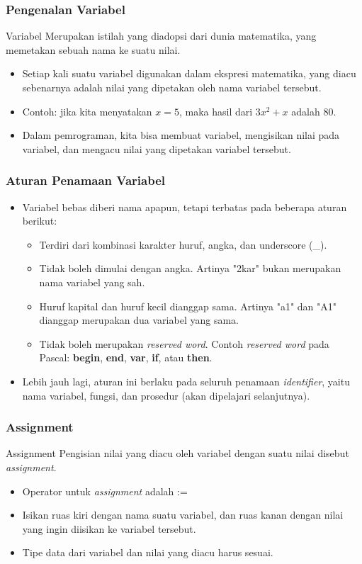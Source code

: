 \begin{frame}[b]
\frametitle{Pengenalan Variabel}
\begin{block}{Variabel}
   Merupakan istilah yang diadopsi dari dunia matematika, yang memetakan sebuah nama ke suatu nilai.
\end{block}
\begin{itemize}
  \item Setiap kali suatu variabel digunakan dalam ekspresi matematika, yang diacu sebenarnya adalah nilai yang dipetakan oleh nama variabel tersebut.
  \item Contoh: jika kita menyatakan $x=5$, maka hasil dari $3x^2 + x$ adalah $80$.
  \item Dalam pemrograman, kita bisa membuat variabel, mengisikan nilai pada variabel, dan mengacu nilai yang dipetakan variabel tersebut.
\end{itemize}
\end{frame}

\begin{frame}
\frametitle{Aturan Penamaan Variabel}
\begin{itemize}
  \item Variabel bebas diberi nama apapun, tetapi terbatas pada beberapa aturan berikut:
  \begin{itemize}
    \item Terdiri dari kombinasi karakter huruf, angka, dan underscore (\_).
    \item Tidak boleh dimulai dengan angka. Artinya "2kar" bukan merupakan nama variabel yang sah.
    \item Huruf kapital dan huruf kecil dianggap sama. Artinya "a1" dan "A1" dianggap merupakan dua variabel yang sama.
    \item Tidak boleh merupakan \alert{\textit{reserved word}}. Contoh \textit{reserved word} pada Pascal: \textbf{begin}, \textbf{end}, \textbf{var}, \textbf{if}, atau \textbf{then}.
  \end{itemize}
  \item Lebih jauh lagi, aturan ini berlaku pada seluruh penamaan \alert{\textit{identifier}}, yaitu nama variabel, fungsi, dan prosedur (akan dipelajari selanjutnya).
\end{itemize}
\end{frame}

\begin{frame}
\frametitle{Assignment}
\begin{block}{Assignment}
  Pengisian nilai yang diacu oleh variabel dengan suatu nilai disebut \alert{\textit{assignment}.}
\end{block}
\begin{itemize}
  \item Operator untuk \textit{assignment} adalah :=
  \item Isikan ruas kiri dengan nama suatu variabel, dan ruas kanan dengan nilai yang ingin diisikan ke variabel tersebut.
  \item Tipe data dari variabel dan nilai yang diacu \alert{harus sesuai}.
\end{itemize}
\end{frame}


